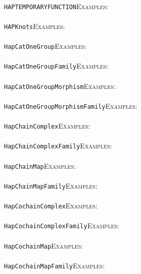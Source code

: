 \documentclass[a4paper,11pt]{report}
\begin{document}
{{ \\
 \texttt{HAPTEMPORARYFUNCTION}{\nobreakspace}{\nobreakspace}{\nobreakspace}{\nobreakspace}\textsc{Examples:} \\
 \\
 \texttt{HAP{\textunderscore}Knots}{\nobreakspace}{\nobreakspace}{\nobreakspace}{\nobreakspace}\textsc{Examples:} \\
 \\
 \texttt{HapCatOneGroup}{\nobreakspace}{\nobreakspace}{\nobreakspace}{\nobreakspace}\textsc{Examples:} \\
 \\
 \texttt{HapCatOneGroupFamily}{\nobreakspace}{\nobreakspace}{\nobreakspace}{\nobreakspace}\textsc{Examples:} \\
 \\
 \texttt{HapCatOneGroupMorphism}{\nobreakspace}{\nobreakspace}{\nobreakspace}{\nobreakspace}\textsc{Examples:} \\
 \\
 \texttt{HapCatOneGroupMorphismFamily}{\nobreakspace}{\nobreakspace}{\nobreakspace}{\nobreakspace}\textsc{Examples:} \\
 \\
 \texttt{HapChainComplex}{\nobreakspace}{\nobreakspace}{\nobreakspace}{\nobreakspace}\textsc{Examples:} \\
 \\
 \texttt{HapChainComplexFamily}{\nobreakspace}{\nobreakspace}{\nobreakspace}{\nobreakspace}\textsc{Examples:} \\
 \\
 \texttt{HapChainMap}{\nobreakspace}{\nobreakspace}{\nobreakspace}{\nobreakspace}\textsc{Examples:} \\
 \\
 \texttt{HapChainMapFamily}{\nobreakspace}{\nobreakspace}{\nobreakspace}{\nobreakspace}\textsc{Examples:} \\
 \\
 \texttt{HapCochainComplex}{\nobreakspace}{\nobreakspace}{\nobreakspace}{\nobreakspace}\textsc{Examples:} \\
 \\
 \texttt{HapCochainComplexFamily}{\nobreakspace}{\nobreakspace}{\nobreakspace}{\nobreakspace}\textsc{Examples:} \\
 \\
 \texttt{HapCochainMap}{\nobreakspace}{\nobreakspace}{\nobreakspace}{\nobreakspace}\textsc{Examples:} \\
 \\
 \texttt{HapCochainMapFamily}{\nobreakspace}{\nobreakspace}{\nobreakspace}{\nobreakspace}\textsc{Examples:} \\
}}
\end{document}
